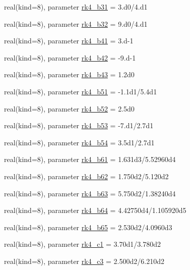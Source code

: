 \begin{DoxyCompactItemize}
real(kind=8), parameter \hyperlink{namespacerk4__coms_a25fefbdc031aa0c923082df76e233542}{rk4\+\_\+b31} = 3.d0/4.d1
\item 
real(kind=8), parameter \hyperlink{namespacerk4__coms_aeadece49a8e779db69ab3c866d710851}{rk4\+\_\+b32} = 9.d0/4.d1
\item 
real(kind=8), parameter \hyperlink{namespacerk4__coms_a027909c6e9575ba7ea384f530f1fea8c}{rk4\+\_\+b41} = 3.d-\/1
\item 
real(kind=8), parameter \hyperlink{namespacerk4__coms_a8e97d0778db0718264f454af0d04e0da}{rk4\+\_\+b42} = -\/9.d-\/1
\item 
real(kind=8), parameter \hyperlink{namespacerk4__coms_a5c0f66631b902af266e04130bea41001}{rk4\+\_\+b43} = 1.\+2d0
\item 
real(kind=8), parameter \hyperlink{namespacerk4__coms_a0667d689a2690f395681dd54718dd9b0}{rk4\+\_\+b51} = -\/1.\+1d1/5.\+4d1
\item 
real(kind=8), parameter \hyperlink{namespacerk4__coms_a08136775ca79aa4cfb6e2bc844bfb689}{rk4\+\_\+b52} = 2.\+5d0
\item 
real(kind=8), parameter \hyperlink{namespacerk4__coms_adedd306e0a9a351610026b3a12d2e5ce}{rk4\+\_\+b53} = -\/7.d1/2.\+7d1
\item 
real(kind=8), parameter \hyperlink{namespacerk4__coms_a3d702309397c009b9a62c0900da4a7c5}{rk4\+\_\+b54} = 3.\+5d1/2.\+7d1
\item 
real(kind=8), parameter \hyperlink{namespacerk4__coms_a69b8b27ac5165b14e52efd1d57e3247d}{rk4\+\_\+b61} = 1.\+631d3/5.\+52960d4
\item 
real(kind=8), parameter \hyperlink{namespacerk4__coms_a1424e7b77cc58817b30146a6ed80c076}{rk4\+\_\+b62} = 1.\+750d2/5.\+120d2
\item 
real(kind=8), parameter \hyperlink{namespacerk4__coms_a2943f8989d0d72c6913d114141dcfe5d}{rk4\+\_\+b63} = 5.\+750d2/1.\+38240d4
\item 
real(kind=8), parameter \hyperlink{namespacerk4__coms_a6738b7b2098994211bfcafa79e4cc584}{rk4\+\_\+b64} = 4.\+42750d4/1.\+105920d5
\item 
real(kind=8), parameter \hyperlink{namespacerk4__coms_a5635aa326f6d3f256b21cb6aaf2d4ed0}{rk4\+\_\+b65} = 2.\+530d2/4.\+0960d3
\item 
real(kind=8), parameter \hyperlink{namespacerk4__coms_a1dd142bdfa35986937ac4396a759dda0}{rk4\+\_\+c1} = 3.\+70d1/3.\+780d2
\item 
real(kind=8), parameter \hyperlink{namespacerk4__coms_a94a604a5d0d271bf875f0fd3338fef3e}{rk4\+\_\+c3} = 2.\+500d2/6.\+210d2

\end{DoxyCompactItemize}
